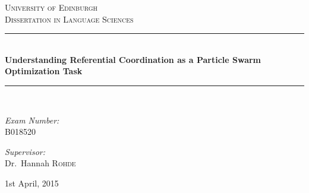 \documentclass[12pt,a4paper]{article}
\newcommand{\HRule}{\rule{\linewidth}{0.5mm}}
\begin{document}
\begin{titlepage}

\begin{center}

\textsc{\LARGE University of Edinburgh}\\[1cm]

\textsc{\Large Dissertation in Language Sciences}\\[1.5cm]

\HRule \\[0.4cm]
{ \huge \bfseries Understanding Referential Coordination as a Particle Swarm Optimization Task \\[0.4cm] }

\HRule \\[1.5cm]


\noindent
\begin{minipage}{0.4\textwidth}
\begin{flushleft} \large
\emph{Exam Number:}\\
\textsc{B018520}
\end{flushleft}
\end{minipage}%
\begin{minipage}{0.4\textwidth}
\begin{flushright} \large
\emph{Supervisor:} \\
Dr.~Hannah \textsc{Rohde}
\end{flushright}
\end{minipage}

\vfill

{\large 1st April, 2015}


\end{center}
\end{titlepage}

\doublespace
\end{document}
